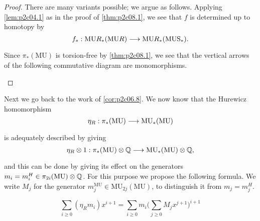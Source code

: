 \documentclass[../main]{subfiles}
\begin{document}
\begin{proof}
There are many variants possible; we argue as follows. Applying \eqref{lem:p2c04.1} as in the proof of \eqref{thm:p2c08.1}, we see that $f$ is determined up to homotopy by \[f_\ast : \te{MU}R_\ast(\te{MU}R) \lar{} \te{MU}R_\ast(\mathrm {MUS}_\ast).\] Since $\pi_\ast(\mathrm{MU})$ is torsion-free by \ref{thm:p2c08.1}, we see that the vertical arrows of the following commutative diagram are monomorphisms.

\begin{center}
\end{center}
\end{proof}

Next we go back to the work of \eqref{cor:p2c06.8}. We now know that the Hurewicz homomorphism \[\eta_R : \pi_\ast (\mathrm{MU}) \lar{} \mathrm {MU}_\ast (\mathrm {MU})\] is adequately described by giving \[\eta_R \otimes 1 : \pi_\ast(\mathrm {MU}) \otimes \bbQ \lar{} \mathrm{MU}_\ast(\mathrm {MU}) \otimes \bbQ,\] and this can be done by giving its effect on the generators $m_i = m_i^H \in \pi_{2i} (\mathrm{MU}) \otimes \mathbb{Q}$. For this purpose we propose the following formula. We write $M_j$ for the generator $m_j^{\mathrm{MU}} \in \mathrm{MU}_{2j} (\mathrm {MU})$, to distinguish it from $m_j = m_j^H$.

\begin{proposition}
\label{prop:p2c09.4}
\[\sum_{i \ge 0} (\eta_R m_i)x^{i + 1} = \sum_{i \ge 0} m_i \bigg(\sum_{j \ge 0} M_j x^{j + 1}\bigg)^{i + 1}\]
\end{proposition}
\end{document}
